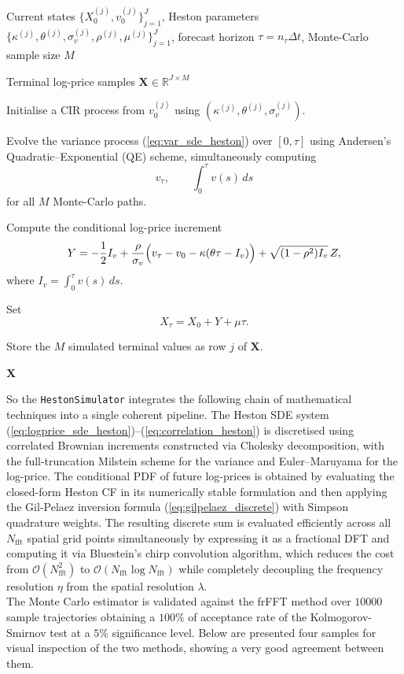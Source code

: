 \begin{algorithm}[H]
\caption{Monte-Carlo Conditional Heston PDF}
\label{alg:heston_mc_pdf}
\begin{algorithmic}[1]

\REQUIRE Current states $\{X_0^{(j)},v_0^{(j)}\}_{j=1}^{J}$,
Heston parameters
$\{\kappa^{(j)},\theta^{(j)},\sigma_v^{(j)},\rho^{(j)},\mu^{(j)}\}_{j=1}^{J}$,
forecast horizon $\tau=n_\tau\Delta t$,
Monte-Carlo sample size $M$

\ENSURE Terminal log-price samples
$\mathbf{X}\in\mathbb{R}^{J\times M}$


    \STATE Initialise a CIR process from $v_0^{(j)}$ using
    $(\kappa^{(j)},\theta^{(j)},\sigma_v^{(j)})$.

    \STATE Evolve the variance process
    (\ref{eq:var_sde_heston}) over $[0,\tau]$
    using Andersen's Quadratic--Exponential (QE) scheme,
    simultaneously computing
    \[
        v_\tau,
        \qquad
        \int_0^\tau v(s)\,ds
    \]
    for all $M$ Monte-Carlo paths.

\STATE   Compute the conditional log-price increment
\[
Y=
-\frac12 I_v
+\frac{\rho}{\sigma_v}
\Bigl(v_\tau-v_0-\kappa(\theta\tau-I_v)\Bigr)
+\sqrt{(1-\rho^2)I_v}\,Z,
\]
where $I_v=\int_0^\tau v(s)\,ds$.

\STATE Set
\[
X_\tau=X_0+Y+\mu\tau.
\]

    \STATE Store the $M$ simulated terminal values as row $j$ of
    $\mathbf{X}$.

\ENDFOR

\RETURN $\mathbf{X}$

\end{algorithmic}
\end{algorithm}

So the \texttt{HestonSimulator} integrates the following chain of mathematical techniques into a single coherent pipeline. 
The Heston SDE system (\ref{eq:logprice_sde_heston})--(\ref{eq:correlation_heston}) is discretised using correlated Brownian increments constructed via Cholesky decomposition, 
with the full-truncation Milstein scheme for the variance and Euler--Maruyama for the log-price. 
The conditional PDF of future log-prices is obtained by evaluating the closed-form Heston CF in its numerically 
stable formulation and then applying the Gil-Pelaez inversion formula (\ref{eq:gilpelaez_discrete}) with Simpson quadrature weights.
The resulting discrete sum is evaluated efficiently across all $N_\text{fft}$ spatial grid points simultaneously by expressing it as a fractional DFT and computing
it via Bluestein's chirp convolution algorithm, which reduces the cost from $\mathcal{O}(N_\text{fft}^2)$ to $\mathcal{O}(N_\text{fft}\log N_\text{fft})$ 
while completely decoupling the frequency resolution $\eta$ from the spatial resolution $\lambda$.\\
The Monte Carlo estimator is validated against the frFFT method over $10000$ sample trajectories obtaining a $100\%$ of acceptance rate of the Kolmogorov-Smirnov test at a $5\%$ significance level.
Below are presented four samples for visual inspection of the two methods, showing a very good agreement between them.

